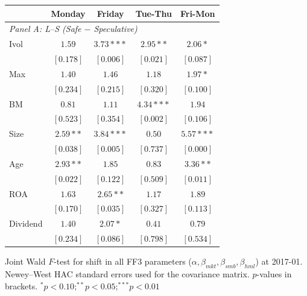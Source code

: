 \centering
\footnotesize
\begin{tabular}{l c c c c}
\toprule
 & Monday & Friday & Tue-Thu & Fri-Mon \\
\midrule
\multicolumn{5}{l}{\textit{Panel A: L--S (Safe $-$ Speculative)}} \\
Ivol & $1.59$ & $3.73***$ & $2.95**$ & $2.06*$ \\
 & $[0.178]$ & $[0.006]$ & $[0.021]$ & $[0.087]$ \\
Max & $1.40$ & $1.46$ & $1.18$ & $1.97*$ \\
 & $[0.234]$ & $[0.215]$ & $[0.320]$ & $[0.100]$ \\
BM & $0.81$ & $1.11$ & $4.34***$ & $1.94$ \\
 & $[0.523]$ & $[0.354]$ & $[0.002]$ & $[0.106]$ \\
Size & $2.59**$ & $3.84***$ & $0.50$ & $5.57***$ \\
 & $[0.038]$ & $[0.005]$ & $[0.737]$ & $[0.000]$ \\
Age & $2.93**$ & $1.85$ & $0.83$ & $3.36**$ \\
 & $[0.022]$ & $[0.122]$ & $[0.509]$ & $[0.011]$ \\
ROA & $1.63$ & $2.65**$ & $1.17$ & $1.89$ \\
 & $[0.170]$ & $[0.035]$ & $[0.327]$ & $[0.113]$ \\
Dividend & $1.40$ & $2.07*$ & $0.41$ & $0.79$ \\
 & $[0.234]$ & $[0.086]$ & $[0.798]$ & $[0.534]$ \\
\bottomrule
\end{tabular}
\vspace{4pt}
\begin{minipage}{0.9\textwidth}
\footnotesize
Joint Wald $F$-test for shift in all FF3 parameters ($\alpha, \beta_{mkt}, \beta_{smb}, \beta_{hml}$) at 2017-01.
Newey--West HAC standard errors used for the covariance matrix.
$p$-values in brackets. $^{*}p<0.10$;\quad $^{**}p<0.05$;\quad $^{***}p<0.01$
\end{minipage}